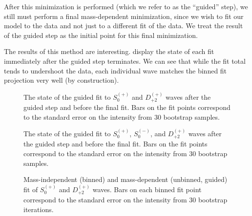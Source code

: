 After this minimization is performed (which we refer to as the ``guided'' step), we still must perform a final mass-dependent minimization, since we wish to fit our model to the data and not just to a different fit of the data. We treat the result of the guided step as the initial point for this final minimization.

The results of this method are interesting.  display the state of each fit immediately after the guided step terminates. We can see that while the fit total tends to undershoot the data, each individual wave matches the binned fit projection very well (by construction).

\begin{figure}
  \begin{center}
    
  \end{center}
  \caption{The state of the guided fit to $S_{0}^{(+)}$ and $D_{+2}^{(+)}$ waves after the guided step and before the final fit. Bars on the fit points correspond to the standard error on the intensity from $ 30 $ bootstrap samples.}\label{fig:guided-fit-chisqdof-3.0-Sp-D2p}
\end{figure}

\begin{figure}
  \begin{center}
    
  \end{center}
  \caption{The state of the guided fit to $S_{0}^{(+)}$, $S_{0}^{(-)}$, and $D_{+2}^{(+)}$ waves after the guided step and before the final fit. Bars on the fit points correspond to the standard error on the intensity from $ 30 $ bootstrap samples.}\label{fig:guided-fit-chisqdof-3.0-Spn-D2p}
\end{figure}

\begin{figure}
  \begin{center}
    
  \end{center}
  \caption{Mass-independent (binned) and mass-dependent (unbinned, guided) fit of $S_{0}^{(+)}$ and $D_{+2}^{(+)}$ waves. Bars on each binned fit point correspond to the standard error on the intensity from $ 30 $ bootstrap iterations.}\label{fig:unbinned-guided-fit-chisqdof-3.0-Sp-D2p}
\end{figure}

